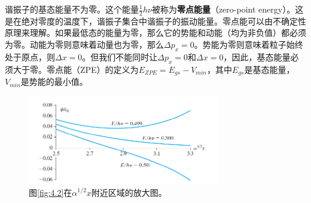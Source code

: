     谐振子的基态能量不为零。这个能量$\frac{1}{2}h\nu$被称为\textbf{零点能量}（zero-point energy）。这是在绝对零度的温度下，谐振子集合中谐振子的振动能量。零点能可以由不确定性原理来理解。如果最低态的能量为零，那么它的势能和动能（均为非负值）都必须为零。动能为零则意味着动量也为零，那么$\Delta p_x = 0$。势能为零则意味着粒子始终处于原点，则$\Delta x = 0$。但我们不能同时让$\Delta p_x = 0$和$\Delta x = 0$，因此，基态能量必须大于零。零点能（ZPE）的定义为$E_{ZPE}=E_{gs} - V_{min}$，其中$E_{gs}$是基态能量，$V_{min}$是势能的最小值。
    \begin{figure}[ht]
        \centering
        \includegraphics[width=0.75\textwidth]{Figures/4.3.png}
        \caption{
            图\ref{fig:4.2}在$\alpha^{1/2}x$附近区域的放大图。
        }
        \label{fig:4.3}
    \end{figure}

